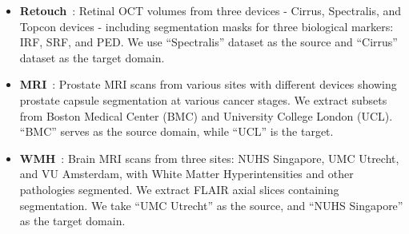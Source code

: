 \begin{itemize}
    \item{\textbf{Retouch}~}: Retinal OCT volumes from three devices - Cirrus, Spectralis, and Topcon devices - including segmentation masks for three biological markers: IRF, SRF, and PED. We use ``Spectralis'' dataset as the source and ``Cirrus'' dataset as the target domain. 
    
    
    \item{\textbf{MRI}~}: Prostate MRI scans from various sites with different devices showing prostate capsule segmentation at various cancer stages. We extract subsets from Boston Medical Center (BMC) and University College London (UCL). ``BMC'' serves as the source domain, while ``UCL'' is the target.
    
    
    \item{\textbf{WMH}~}: Brain MRI scans from three sites: NUHS Singapore, UMC Utrecht, and VU Amsterdam, with White Matter Hyperintensities and other pathologies segmented. We extract FLAIR axial slices containing segmentation. We take ``UMC Utrecht'' as the source, and ``NUHS Singapore'' as the target domain.
    


\end{itemize}
